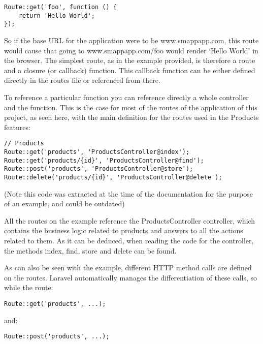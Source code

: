 \begin{verbatim}
Route::get('foo', function () {
    return 'Hello World';
});
\end{verbatim}

So if the base URL for the application were to be www.smappapp.com, this route would cause that going to www.smappapp.com/foo would render ‘Hello World’ in the browser. The simplest route, as in the example provided, is therefore a route and a closure (or callback) function. This callback function can be either defined directly in the routes file or referenced from there.

To reference a particular function you can reference directly a whole controller and the function. This is the case for most of the routes of the application of this project, as seen here, with the main definition for the routes used in the Products features:

\begin{verbatim}
// Products
Route::get('products', 'ProductsController@index');
Route::get('products/{id}', 'ProductsController@find');
Route::post('products', 'ProductsController@store');
Route::delete('products/{id}', 'ProductsController@delete');
\end{verbatim}

(Note this code was extracted at the time of the documentation for the purpose of an example, and could be outdated)

All the routes on the example reference the ProductsController controller, which contains the business logic related to products and answers to all the actions related to them. As it can be deduced, when reading the code for the controller, the methods index, find, store and delete can be found.

As can also be seen with the example, different HTTP method calls are defined on the routes. Laravel automatically manages the differentiation of these calls, so while the route:

\begin{verbatim}
Route::get('products', ...);
\end{verbatim}

and:

\begin{verbatim}
Route::post('products', ...);
\end{verbatim}

